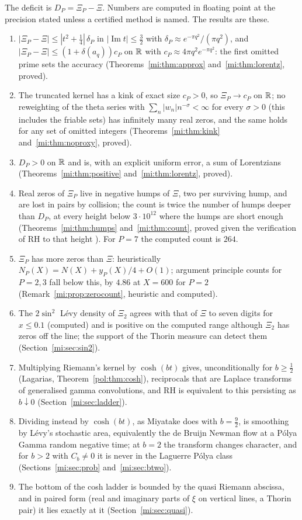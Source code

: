 The deficit is $D_P=\Xi_P-\Xi$. Numbers are computed in floating point at the precision stated unless a certified method is named. The results are these.
\begin{enumerate}
\item $|\Xi_P-\Xi|\le|t^2+\tfrac14|\,\delta_P$ in $|\operatorname{Im}t|\le\tfrac32$ with $\delta_P\approx e^{-\pi q^2}/(\pi q^2)$, and $|\Xi_P-\Xi|\le(1+\delta(a_q))c_P$ on $\mathbb{R}$ with $c_P\approx4\pi q^2e^{-\pi q^2}$: the first omitted prime sets the accuracy (Theorems~\ref{mi:thm:approx} and~\ref{mi:thm:lorentz}, proved).
\item The truncated kernel has a kink of exact size $c_P>0$, so $\Xi_P\to c_P$ on $\mathbb{R}$; no reweighting of the theta series with $\sum_n|w_n|n^{-\sigma}<\infty$ for every $\sigma>0$ (this includes the friable sets) has infinitely many real zeros, and the same holds for any set of omitted integers (Theorems~\ref{mi:thm:kink} and~\ref{mi:thm:noproxy}, proved).
\item $D_P>0$ on $\mathbb{R}$ and is, with an explicit uniform error, a sum of Lorentzians (Theorems~\ref{mi:thm:positive} and~\ref{mi:thm:lorentz}, proved).
\item Real zeros of $\Xi_P$ live in negative humps of $\Xi$, two per surviving hump, and are lost in pairs by collision; the count is twice the number of humps deeper than $D_P$, at every height below $3\cdot10^{12}$ where the humps are short enough (Theorems~\ref{mi:thm:humps} and~\ref{mi:thm:count}, proved given the verification of RH to that height \cite{PT21}). For $P=7$ the computed count is $264$.
\item $\Xi_P$ has more zeros than $\Xi$: heuristically $N_P(X)=N(X)+y_P(X)/4+O(1)$; argument principle counts for $P=2,3$ fall below this, by $4.86$ at $X=600$ for $P=2$ (Remark~\ref{mi:prop:zerocount}, heuristic and computed).
\item The $2\sin^2$ L\'evy density of $\Xi_2$ agrees with that of $\Xi$ to seven digits for $x\le0.1$ (computed) and is positive on the computed range although $\Xi_2$ has zeros off the line; the support of the Thorin measure can detect them (Section~\ref{mi:sec:sin2}).
\item Multiplying Riemann's kernel by $\cosh(bt)$ gives, unconditionally for $b\ge\frac12$ (Lagarias, Theorem~\ref{pol:thm:cosh}), reciprocals that are Laplace transforms of generalised gamma convolutions, and RH is equivalent to this persisting as $b\downarrow0$ (Section~\ref{mi:sec:ladder}).
\item Dividing instead by $\cosh(bt)$, as Miyatake does with $b=\frac92$, is smoothing by L\'evy's stochastic area, equivalently the de Bruijn Newman flow at a P\'olya Gamma random negative time; at $b=2$ the transform changes character, and for $b>2$ with $C_b\ne0$ it is never in the Laguerre P\'olya class (Sections~\ref{mi:sec:prob} and~\ref{mi:sec:btwo}).
\item The bottom of the cosh ladder is bounded by the quasi Riemann abscissa, and in paired form (real and imaginary parts of $\xi$ on vertical lines, a Thorin pair) it lies exactly at it (Section~\ref{mi:sec:quasi}).
\end{enumerate}
